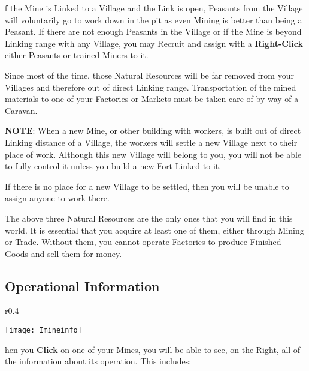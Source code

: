 
f the Mine is Linked to a Village and the Link is open, Peasants from the Village will voluntarily go to work down in the pit as even Mining is better than being a Peasant. If there are not enough Peasants in the Village or if the Mine is beyond Linking range with any Village, you may Recruit and assign with a \textbf{Right-Click} either Peasants or trained Miners to it.

Since most of the time, those Natural Resources will be far removed from your Villages and therefore out of direct Linking range. Transportation of the mined materials to one of your Factories or Markets must be taken care of by way of a Caravan.

\textbf{NOTE}: When a new Mine, or other building with workers, is built out of direct Linking distance of a Village, the workers will settle a new Village next to their place of work. Although this new Village will belong to you, you will not be able to fully control it unless you build a new Fort Linked to it.

If there is no place for a new Village to be settled, then you will be unable to assign anyone to work there.

The above three Natural Resources are the only ones that you will find in this world. It is essential that you acquire at least one of them, either through Mining or Trade. Without them, you cannot operate Factories to produce Finished Goods and sell them for money.

\subsection{\textsf{Operational Information}}


\begin{wrapfigure}{r}{0.4\textwidth}
    \vspace{-20pt}
    \begin{center}
        \texttt{[image: Imineinfo]} %
    \end{center}
    \vspace{-50pt}
\end{wrapfigure}

hen you \textbf{Click} on one of your Mines, you will be able to see, on the Right, all of the information about its operation. This includes:

